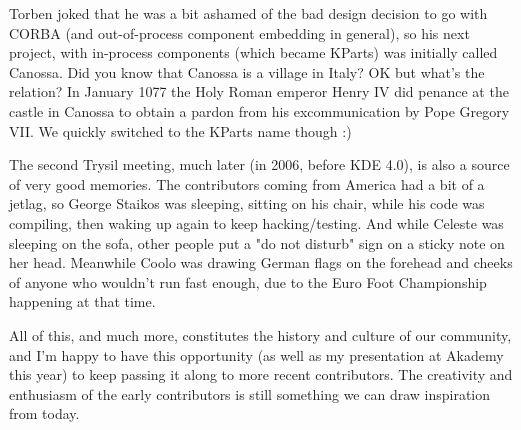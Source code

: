 Torben joked that he was a bit ashamed of the bad design decision to go with CORBA (and out-of-process component embedding in general), so his next project, with in-process components (which became KParts) was initially called Canossa. Did you know that Canossa is a village in Italy? OK but what's the relation? In January 1077 the Holy Roman emperor Henry IV did penance at the castle in Canossa to obtain a pardon from his excommunication by Pope Gregory VII. We quickly switched to the KParts name though :)

The second Trysil meeting, much later (in 2006, before KDE 4.0), is also a source of very good memories. The contributors coming from America had a bit of a jetlag, so George Staikos was sleeping, sitting on his chair, while his code was compiling, then waking up again to keep hacking/testing. And while Celeste was sleeping on the sofa, other people put a "do not disturb" sign on a sticky note on her head. Meanwhile Coolo was drawing German flags on the forehead and cheeks of anyone who wouldn't run fast enough, due to the Euro Foot Championship happening at that time.

All of this, and much more, constitutes the history and culture of our community, and I'm happy to have this opportunity (as well as my presentation at Akademy this year) to keep passing it along to more recent contributors. The creativity and enthusiasm of the early contributors is still something we can draw inspiration from today.
